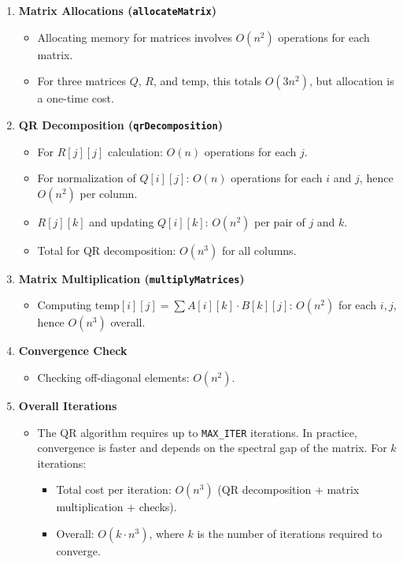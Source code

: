 \documentclass{article}
\begin{document}
\begin{enumerate}
    \item \textbf{Matrix Allocations (\texttt{allocateMatrix})}
    \begin{itemize}
        \item Allocating memory for matrices involves \( O(n^2) \) operations for each matrix.
        \item For three matrices \( Q \), \( R \), and \( \text{temp} \), this totals \( O(3n^2) \), but allocation is a one-time cost.
    \end{itemize}
    
    \item \textbf{QR Decomposition (\texttt{qrDecomposition})}
    \begin{itemize}
        \item For \( R[j][j] \) calculation: \( O(n) \) operations for each \( j \).
        \item For normalization of \( Q[i][j] \): \( O(n) \) operations for each \( i \) and \( j \), hence \( O(n^2) \) per column.
        \item \( R[j][k] \) and updating \( Q[i][k] \): \( O(n^2) \) per pair of \( j \) and \( k \).
        \item Total for QR decomposition: \( O(n^3) \) for all columns.
    \end{itemize}
    
    \item \textbf{Matrix Multiplication (\texttt{multiplyMatrices})}
    \begin{itemize}
        \item Computing \( \text{temp}[i][j] = \sum A[i][k] \cdot B[k][j] \): \( O(n^2) \) for each \( i, j \), hence \( O(n^3) \) overall.
    \end{itemize}
    
    \item \textbf{Convergence Check}
    \begin{itemize}
        \item Checking off-diagonal elements: \( O(n^2) \).
    \end{itemize}
    
    \item \textbf{Overall Iterations}
    \begin{itemize}
        \item The QR algorithm requires up to \texttt{MAX\_ITER} iterations. In practice, convergence is faster and depends on the spectral gap of the matrix. For \( k \) iterations:
        \begin{itemize}
            \item Total cost per iteration: \( O(n^3) \) (QR decomposition + matrix multiplication + checks).
            \item Overall: \( O(k \cdot n^3) \), where \( k \) is the number of iterations required to converge.
        \end{itemize}
    \end{itemize}
\end{enumerate}
\end{document}
